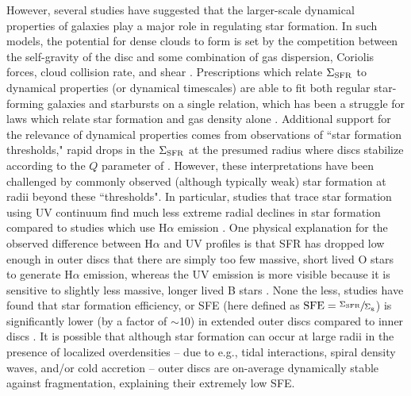\documentclass[fleqn,usenatbib]{mnras}
\begin{document}
However, several studies have suggested that the larger-scale dynamical properties of galaxies play a major role in regulating star formation.  In such models, the potential for dense clouds to form is set by the competition between the self-gravity of the disc and some combination of gas dispersion, Coriolis forces, cloud collision rate, and shear
\citep{Safronov60,Toomre64,Jog84,Romeo92,Wang94,Hunter98,Tan00, Rafikov01,Elmegreen11}. Prescriptions which relate $\Sigma_{\rm SFR}$ to dynamical properties (or dynamical timescales) are able to fit both regular star-forming galaxies and starbursts on a single relation, which has been a struggle for laws which relate star formation and gas density alone \citep{Daddi10,Genzel10,Utreras16}. Additional support for the relevance of dynamical properties comes from observations of ``star formation thresholds," rapid drops in the $\Sigma_{\rm SFR}$ at the presumed radius where discs stabilize \citep{Kennicutt89,Martin01} according to the $Q$ parameter of \citet{Toomre64}. However, these interpretations have been challenged by commonly observed (although typically weak) star formation at radii beyond these ``thresholds".  In particular, studies that trace star formation using UV continuum find much less extreme radial declines in star formation compared to studies which use H$\alpha$ emission \citep{Ferguson98,Ryan-Weber04,GildePaz05,Boissier07,Thilker07,Werk10,Christlein10,Hunter10,Lemonias11,Moffett12}. One physical explanation for the observed difference between H$\alpha$ and UV profiles is that SFR has dropped low enough in outer discs that there are simply too few massive, short lived O stars to generate H$\alpha$ emission, whereas the UV emission is more visible because it is sensitive to slightly less massive, longer lived B stars \citep{Boissier07}. None the less, studies have found that star formation efficiency, or SFE (here defined as ${\rm SFE=\sfrac{\Sigma_{\rm SFR}}{\Sigma_{\rm g}}}$) is significantly lower (by a factor of $\sim$10) in extended outer discs compared to inner discs \citep{Kennicutt89,Zasov94,Bigiel10b}.  It is possible that although star formation can occur at large radii in the presence of localized overdensities -- due to e.g., tidal interactions, spiral density waves, and/or cold accretion \citep{Thilker07,Bush08,Roskar10} -- outer discs are on-average dynamically stable against fragmentation, explaining their extremely low SFE. 
\end{document}
